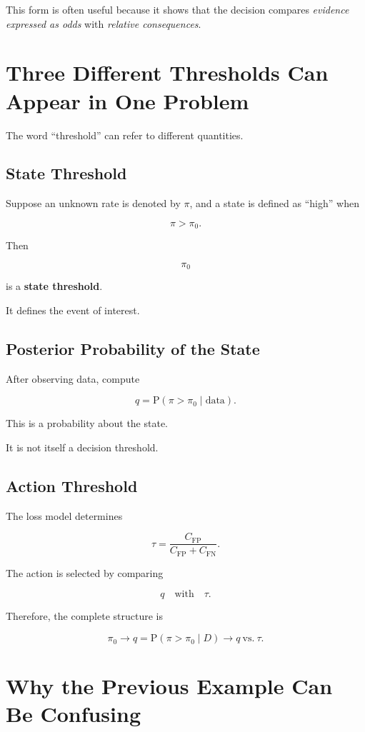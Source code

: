 \documentclass[11pt]{article}
\newcommand{\CFP}{C_{\mathrm{FP}}}
\newcommand{\CFN}{C_{\mathrm{FN}}}
\newcommand{\Prob}{\mathrm{P}}
\begin{document}
This form is often useful because it shows that the decision compares \emph{evidence expressed as odds} with \emph{relative consequences}.

\section{Three Different Thresholds Can Appear in One Problem}

The word ``threshold'' can refer to different quantities.

\subsection{State Threshold}

Suppose an unknown rate is denoted by $\pi$, and a state is defined as ``high'' when

\[
\pi>\pi_0.
\]

Then

\[
\pi_0
\]

is a \textbf{state threshold}.

It defines the event of interest.

\subsection{Posterior Probability of the State}

After observing data, compute

\[
q
=
\Prob(\pi>\pi_0\mid\text{data}).
\]

This is a probability about the state.

It is not itself a decision threshold.

\subsection{Action Threshold}

The loss model determines

\[
\tau
=
\frac{\CFP}{\CFP+\CFN}.
\]

The action is selected by comparing

\[
q
\quad\text{with}\quad
\tau.
\]

Therefore, the complete structure is

\[
\boxed{
\pi_0
\longrightarrow
q=\Prob(\pi>\pi_0\mid D)
\longrightarrow
q\ \text{vs.}\ \tau.
}
\]

\section{Why the Previous Example Can Be Confusing}
\end{document}
